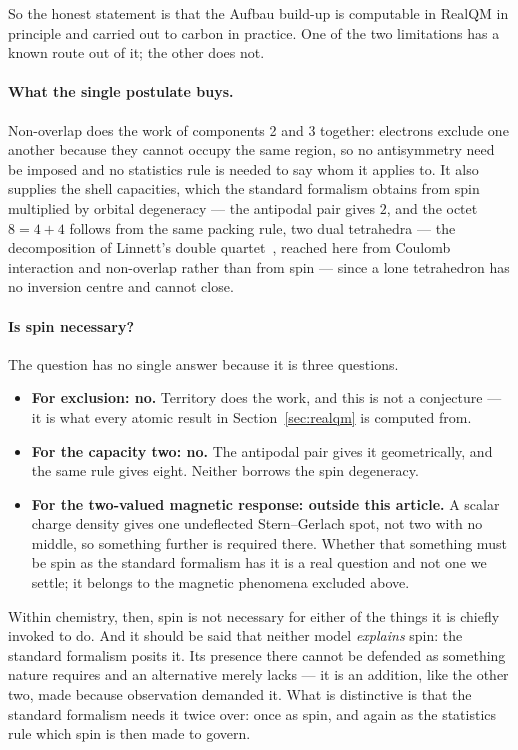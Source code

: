 \documentclass[11pt]{article}
\begin{document}
So the honest statement is that the Aufbau build-up is computable in RealQM in principle and
carried out to carbon in practice. One of the two limitations has a known route out of it; the
other does not.

\paragraph{What the single postulate buys.} Non-overlap does the work of components 2 and 3
together: electrons exclude one another because they cannot occupy the same region, so no
antisymmetry need be imposed and no statistics rule is needed to say whom it applies to. It also
supplies the shell capacities, which the standard formalism obtains from spin multiplied by
orbital degeneracy --- the antipodal pair gives $2$, and the octet $8 = 4{+}4$ follows from the
same packing rule, two dual tetrahedra --- the decomposition of Linnett's double
quartet~\cite{Linnett1961}, reached here from Coulomb interaction and non-overlap rather than
from spin --- since a lone tetrahedron has no inversion centre and cannot close.

\paragraph{Is spin necessary?} The question has no single answer because it is three questions.
\begin{itemize}
\item \textbf{For exclusion: no.} Territory does the work, and this is not a conjecture --- it is
what every atomic result in Section~\ref{sec:realqm} is computed from.
\item \textbf{For the capacity two: no.} The antipodal pair gives it geometrically, and the same
rule gives eight. Neither borrows the spin degeneracy.
\item \textbf{For the two-valued magnetic response: outside this article.} A scalar charge
density gives one undeflected Stern--Gerlach spot, not two with no middle, so something further is
required there. Whether that something must be spin as the standard formalism has it is a real
question and not one we settle; it belongs to the magnetic phenomena excluded above.
\end{itemize}

Within chemistry, then, spin is not necessary for either of the things it is chiefly invoked to
do. And it should be said that neither model \emph{explains} spin: the standard formalism posits
it. Its presence there cannot be defended as something nature requires and an alternative merely
lacks --- it is an addition, like the other two, made because observation demanded it. What is
distinctive is that the standard formalism needs it twice over: once as spin, and again as the
statistics rule which spin is then made to govern.
\end{document}

